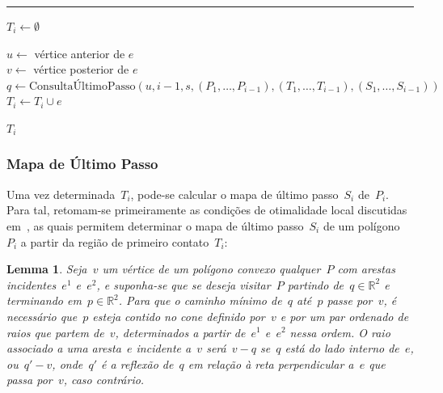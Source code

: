 \documentclass[11pt]{article}
\newcounter{algorithm}
\newcommand{\alglabel}[1]{%
	\refstepcounter{algorithm}%
	\label{#1}%
}
\newtheorem{lemma}[theorem]{Lemma}
\newenvironment{blockQuote}[1][lightgray]{\begin{mdframed}[
	leftline=true,
	topline=false,
	bottomline=false,
	rightline=false,
	linecolor=gray,
	linewidth=2pt,
	backgroundcolor=#1,
	skipabove=\baselineskip,
	skipbelow=\baselineskip,
	innerleftmargin=10pt,
	innerrightmargin=10pt,
	innertopmargin=5pt,
	innerbottommargin=5pt]
}
{\end{mdframed}}
\begin{document}
\begin{algorithm}[!ht]
\alglabel{alg:first_contact_region}
\caption{Região de Primeiro Contato}

\vspace{0.3em}
\hrule
\vspace{0.3em}

 {

	\(T_i \leftarrow \emptyset\)
	
	 {
	
		\(u \leftarrow\) vértice anterior de \(e\) \\
		\(v \leftarrow\) vértice posterior de \(e\) \\
	
		\(q \leftarrow \text{ConsultaÚltimoPasso}(u, i - 1, s, (P_1, \dots, P_{i - 1}), (T_1, \dots, T_{i - 1}), (S_1, \dots, S_{i - 1}))\) \\
	
		 {
			\(T_i \leftarrow T_i \cup e\)
		}
	}
	
	\Return {} \(T_i\)
}

\end{algorithm}

\subsubsection{Mapa de Último Passo}

Uma vez determinada~\(T_i\), pode-se calcular o mapa de último passo~\(S_i\) de~\(P_i\). Para tal, retomam-se primeiramente as condições de otimalidade local discutidas em~\cite[\textbf{Local Optimality Conditions.}]{tpp-dror2003}, as quais permitem determinar o mapa de último passo~\(S_i\) de um polígono~\(P_i\) a partir da região de primeiro contato~\(T_i\):


\begin{blockQuote}
\begin{lemma}
	Seja~\(v\) um vértice de um polígono convexo qualquer~\(P\) com arestas incidentes~\(e^1\) e~\(e^2\), e suponha-se que se deseja visitar~\(P\) partindo de~\(q \in \mathbb{R}^2\) e terminando em~\(p \in \mathbb{R}^2\). Para que o caminho mínimo de~\(q\) até~\(p\) passe por~\(v\), é necessário que~\(p\) esteja contido no cone definido por~\(v\) e por um par ordenado de raios que partem de~\(v\), determinados a partir de~\(e^1\) e~\(e^2\) nessa ordem. O raio associado a uma aresta~\(e\) incidente a~\(v\) será~\(v - q\) se~\(q\) está do lado interno de~\(e\), ou~\(q' - v\), onde~\(q'\) é a reflexão de~\(q\) em relação à reta perpendicular a~\(e\) que passa por~\(v\), caso contrário. \label{lemma:2.2}
\end{lemma}
\end{blockQuote}
\end{document}
